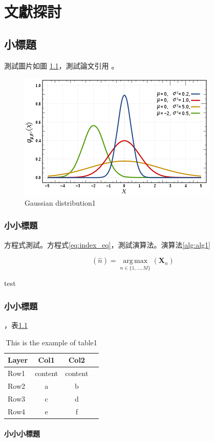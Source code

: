 \chapter{文獻探討}

\section{小標題}

\zhlipsum[1][name=trad]

測試圖片如圖 \ref{fig:figure_ref}，測試論文引用 \cite{Ymc}。

\begin{figure}[h]
  \centerline{\includegraphics[width=0.5\columnwidth]{Images/gambar.png}}
  \caption{Gaussian distribution1}
  \label{fig:figure_ref}
\end{figure}

\subsection{小小標題}

方程式測試。方程式\ref{eq:index_eq}，測試演算法。演算法\ref{alg:alg1}

\begin{equation}
  \label{eq:index_eq}
  (\hat{n})=\operatorname*{arg\,max}_{n\in \{1,\dots,M\}}(\mathbf{X}_{n})
\end{equation}
 
\begin{algorithm}
	\caption{test}
  \label{alg:alg1}
\end{algorithm}

\subsection{小小標題}

\zhlipsum[1][name=trad]，表\ref{table:table1}


\begin{table}[h!]
  \begin{center}
    \caption{This is the example of table1}
    \label{table:table1}
    \begin{tabular}{|l|c|c|c|}
      \hline
      \textbf{Layer} & \textbf{Col1} & \textbf{Col2} \\ %
      \hline
      Row1 & content & content \\ %
      Row2 & a & b \\ %
      Row3 & c & d \\ %
      Row4 & e & f \\ %
      \hline
    \end{tabular}
  \end{center}
\end{table}
\subsubsection{小小小標題}